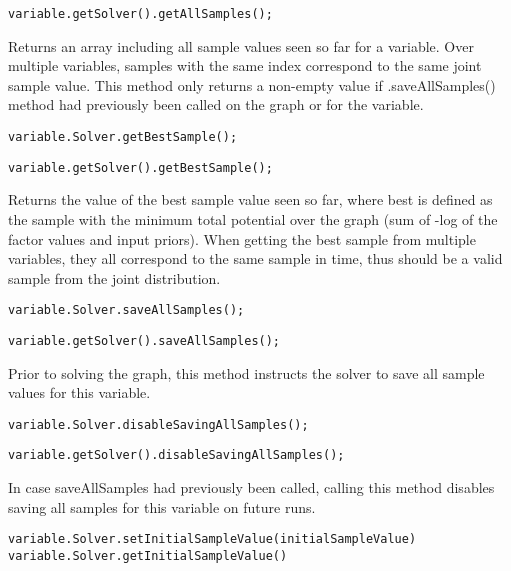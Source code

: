 \ifjava
\begin{lstlisting}
variable.getSolver().getAllSamples();
\end{lstlisting}
\fi

Returns an array including all sample values seen so far for a variable. Over multiple variables, samples with the same index correspond to the same joint sample value. This method only returns a non-empty value if .saveAllSamples() method had previously been called on the graph or for the variable.

\ifmatlab
\begin{lstlisting}
variable.Solver.getBestSample();
\end{lstlisting}
\fi

\ifjava
\begin{lstlisting}
variable.getSolver().getBestSample();
\end{lstlisting}
\fi


Returns the value of the best sample value seen so far, where best is defined as the sample with the minimum total potential over the graph (sum of -log of the factor values and input priors).  When getting the best sample from multiple variables, they all correspond to the same sample in time, thus should be a valid sample from the joint distribution.

\ifmatlab
\begin{lstlisting}
variable.Solver.saveAllSamples();
\end{lstlisting}
\fi

\ifjava
\begin{lstlisting}
variable.getSolver().saveAllSamples();
\end{lstlisting}
\fi

Prior to solving the graph, this method instructs the solver to save all sample values for this variable.

\ifmatlab
\begin{lstlisting}
variable.Solver.disableSavingAllSamples();
\end{lstlisting}
\fi

\ifjava
\begin{lstlisting}
variable.getSolver().disableSavingAllSamples();
\end{lstlisting}
\fi

In case saveAllSamples had previously been called, calling this method disables saving all samples for this variable on future runs.

\ifmatlab
\begin{lstlisting}
variable.Solver.setInitialSampleValue(initialSampleValue)
variable.Solver.getInitialSampleValue()
\end{lstlisting}
\fi

